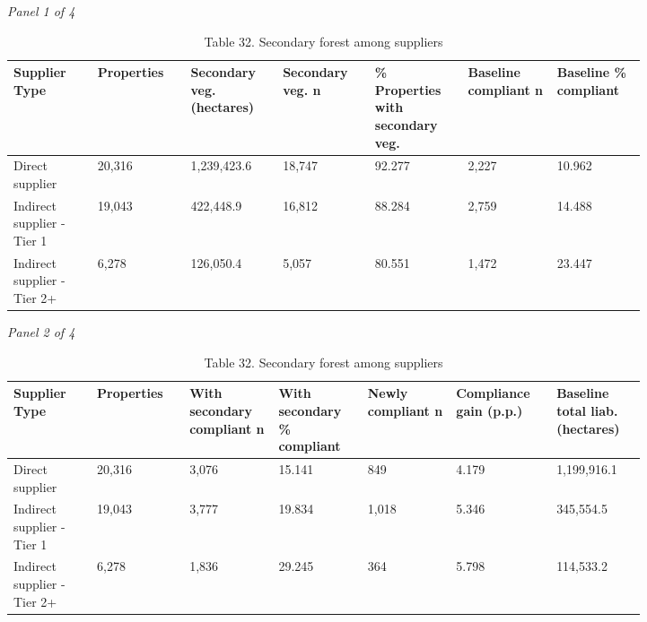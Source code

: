 \documentclass[12pt]{article}
\begin{document}
\begin{landscape}
\begin{table}[H]
\centering
\caption{Table 32. Secondary forest among suppliers}
\textit{Panel 1 of 4}\\[2pt]
{\fontsize{12}{14}\selectfont
\setlength{\tabcolsep}{3pt}
\renewcommand{\arraystretch}{1.08}
\begin{tabular}{p{0.117\linewidth}p{0.117\linewidth}p{0.117\linewidth}p{0.117\linewidth}p{0.117\linewidth}p{0.117\linewidth}p{0.117\linewidth}}
\toprule
Supplier Type & Properties & Secondary veg. (hectares) & Secondary veg. n & \% Properties with secondary veg. & Baseline compliant n & Baseline \% compliant \\
\midrule
Direct supplier & 20,316 & 1,239,423.6 & 18,747 & 92.277 & 2,227 & 10.962 \\
Indirect supplier - Tier 1 & 19,043 & 422,448.9 & 16,812 & 88.284 & 2,759 & 14.488 \\
Indirect supplier - Tier 2+ & 6,278 & 126,050.4 & 5,057 & 80.551 & 1,472 & 23.447 \\
\bottomrule
\end{tabular}
}

\vspace{0.6em}

\textit{Panel 2 of 4}\\[2pt]
{\fontsize{12}{14}\selectfont
\setlength{\tabcolsep}{3pt}
\renewcommand{\arraystretch}{1.08}
\begin{tabular}{p{0.117\linewidth}p{0.117\linewidth}p{0.117\linewidth}p{0.117\linewidth}p{0.117\linewidth}p{0.117\linewidth}p{0.117\linewidth}}
\toprule
Supplier Type & Properties & With secondary compliant n & With secondary \% compliant & Newly compliant n & Compliance gain (p.p.) & Baseline total liab. (hectares) \\
\midrule
Direct supplier & 20,316 & 3,076 & 15.141 & 849 & 4.179 & 1,199,916.1 \\
Indirect supplier - Tier 1 & 19,043 & 3,777 & 19.834 & 1,018 & 5.346 & 345,554.5 \\
Indirect supplier - Tier 2+ & 6,278 & 1,836 & 29.245 & 364 & 5.798 & 114,533.2 \\
\bottomrule
\end{tabular}
}

\vspace{0.6em}


\end{table}
\end{landscape}
\end{document}
